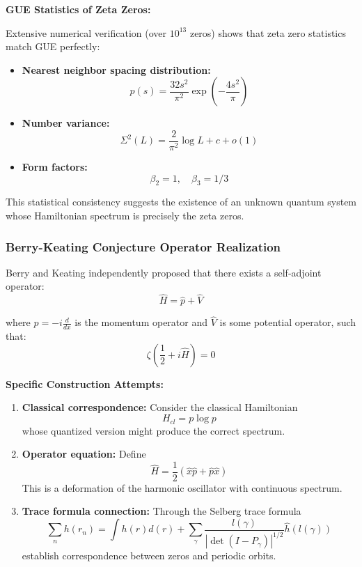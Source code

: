 \documentclass[11pt]{article}
\theoremstyle{plain}
\theoremstyle{definition}
\theoremstyle{remark}
\begin{document}
\textbf{GUE Statistics of Zeta Zeros:}

Extensive numerical verification (over $10^{13}$ zeros) shows that zeta zero statistics match GUE perfectly:

\begin{itemize}
\item \textbf{Nearest neighbor spacing distribution:}
$$p(s) = \frac{32s^2}{\pi^2} \exp\left(-\frac{4s^2}{\pi}\right)$$

\item \textbf{Number variance:}
$$\Sigma^2(L) = \frac{2}{\pi^2} \log L + c + o(1)$$

\item \textbf{Form factors:}
$$\beta_2 = 1, \quad \beta_3 = 1/3$$
\end{itemize}

This statistical consistency suggests the existence of an unknown quantum system whose Hamiltonian spectrum is precisely the zeta zeros.

\subsubsection{Berry-Keating Conjecture Operator Realization}

Berry and Keating independently proposed that there exists a self-adjoint operator:
$$\hat{H} = \hat{p} + \hat{V}$$

where $\hat{p} = -i\frac{d}{dx}$ is the momentum operator and $\hat{V}$ is some potential operator, such that:
$$\zeta\left(\frac{1}{2} + i\hat{H}\right) = 0$$

\textbf{Specific Construction Attempts:}

\begin{enumerate}
\item \textbf{Classical correspondence:} Consider the classical Hamiltonian
$$H_{cl} = p \log p$$
whose quantized version might produce the correct spectrum.

\item \textbf{Operator equation:} Define
$$\hat{H} = \frac{1}{2}(\hat{x}\hat{p} + \hat{p}\hat{x})$$
This is a deformation of the harmonic oscillator with continuous spectrum.

\item \textbf{Trace formula connection:} Through the Selberg trace formula
$$\sum_n h(r_n) = \int h(r) d(r) + \sum_{\gamma} \frac{l(\gamma)}{|\det(I - P_\gamma)|^{1/2}} \hat{h}(l(\gamma))$$
establish correspondence between zeros and periodic orbits.
\end{enumerate}
\end{document}
